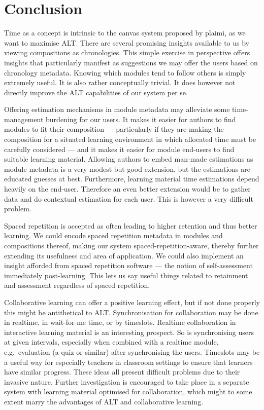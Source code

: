 \section{Conclusion}
Time as a concept is intrinsic to the canvas system proposed by plaimi, as we 
want to maximise ALT. There are several promising insights available to us by 
viewing compositions as chronologies. This simple exercise in perspective 
offers insights that particularly manifest as suggestions we may offer the 
users based on chronology metadata. Knowing which modules tend to follow 
others is simply extremely useful. It is also rather conceptually trivial. It 
does however not directly improve the ALT capabilities of our system per se.

Offering estimation mechanisms in module metadata may alleviate some 
time-management burdening for our users. It makes it easier for authors to 
find modules to fit their composition --- particularly if they are making the 
composition for a situated learning environment in which allocated time must 
be carefully considered --- and it makes it easier for module end-users to 
find suitable learning material. Allowing authors to embed man-made 
estimations as module metadata is a very modest but good extension, but the 
estimations are educated guesses at best. Furthermore, learning material time 
estimations depend heavily on the end-user. Therefore an even better extension 
would be to gather data and do contextual estimation for each user. This is 
however a very difficult problem.

Spaced repetition is accepted as often leading to higher retention and thus 
better learning. We could encode spaced repetition metadata in modules and 
compositions thereof, making our system spaced-repetition-aware, thereby 
further extending its usefulness and area of application. We could also 
implement an insight afforded from spaced repetition software --- the notion 
of self-assessment immediately post-learning. This lets us say useful things 
related to retainment and assessment regardless of spaced repetition.

Collaborative learning can offer a positive learning effect, but if not done 
properly this might be antithetical to ALT. Synchronisation for collaboration 
may be done in realtime, in wait-for-me time, or by timeslots. Realtime 
collaboration in interactive learning material is an interesting prospect. So 
is synchronising users at given intervals, especially when combined with a 
realtime module, e.g.\ evaluation (a quiz or similar) after synchronising the 
users. Timeslots may be a useful way for especially teachers in classroom 
settings to ensure that learners have similar progress. These ideas all 
present difficult problems due to their invasive nature. Further investigation 
is encouraged to take place in a separate system with learning material 
optimised for collaboration, which might to some extent marry the advantages 
of ALT and collaborative learning.

